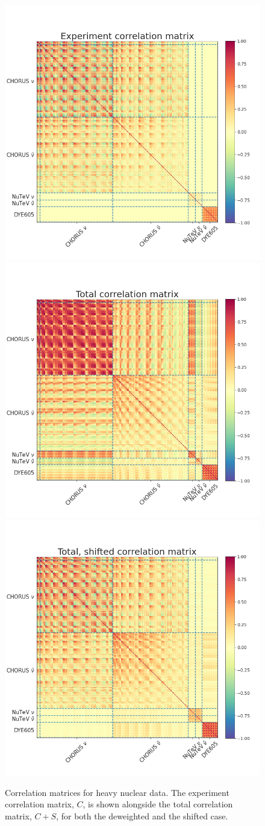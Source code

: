 \begin{figure}[h]
  \begin{center} 
    \includegraphics[width=0.45\linewidth]{nuclear/plots/covmats_Experiment_nuclear.png}
    \includegraphics[width=0.45\linewidth]{nuclear/plots/covmats_Total_nuclear.png}
    \includegraphics[width=0.45\linewidth]{nuclear/plots/covmats_Total_shifted_nuclear.png}
   \caption{ Correlation matrices for heavy nuclear data. The experiment correlation matrix, $C$, is shown alongside the total correlation matrix, $C+S$, for both the deweighted and the shifted case.
    \label{fig:nuccov} }
  \end{center}
\end{figure}

